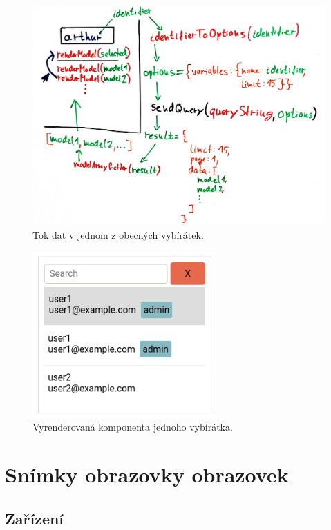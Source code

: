 \begin{figure}[!htb] \centering
  \includegraphics[width=145mm]{../img/picker_lifecycle.jpg}
  \caption{Tok dat v jednom z obecných vybírátek.}
  \label{fig:picker_lifecycle}
\end{figure}

\begin{figure}[!htb] \centering
  \includegraphics[width=70mm]{../img/picker_component.png}
  \caption{Vyrenderovaná komponenta jednoho vybírátka.}
  \label{fig:picker_component}
\end{figure}


\section{Snímky obrazovky obrazovek} \label{screens}

\subsection*{Zařízení}

